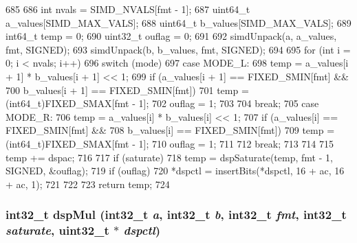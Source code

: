 \begin{DoxyCode}
685 {
686     int nvals = SIMD_NVALS[fmt - 1];
687     uint64_t a_values[SIMD_MAX_VALS];
688     uint64_t b_values[SIMD_MAX_VALS];
689     int64_t temp = 0;
690     uint32_t ouflag = 0;
691 
692     simdUnpack(a, a_values, fmt, SIGNED);
693     simdUnpack(b, b_values, fmt, SIGNED);
694 
695     for (int i = 0; i < nvals; i++) {
696         switch (mode) {
697           case MODE_L:
698             temp = a_values[i + 1] * b_values[i + 1] << 1;
699             if (a_values[i + 1] == FIXED_SMIN[fmt] &&
700                 b_values[i + 1] == FIXED_SMIN[fmt]) {
701                 temp = (int64_t)FIXED_SMAX[fmt - 1];
702                 ouflag = 1;
703             }
704             break;
705           case MODE_R:
706             temp = a_values[i] * b_values[i] << 1;
707             if (a_values[i] == FIXED_SMIN[fmt] &&
708                 b_values[i] == FIXED_SMIN[fmt]) {
709                 temp = (int64_t)FIXED_SMAX[fmt - 1];
710                 ouflag = 1;
711             }
712             break;
713         }
714 
715         temp += dspac;
716 
717         if (saturate)
718             temp = dspSaturate(temp, fmt - 1, SIGNED, &ouflag);
719         if (ouflag)
720             *dspctl = insertBits(*dspctl, 16 + ac, 16 + ac, 1);
721     }
722 
723     return temp;
724 }
\end{DoxyCode}
\hypertarget{namespaceMipsISA_a6b76ad8042f64cf6a93b1b6b8ec59d46}{
\subsubsection[{dspMul}]{\setlength{\rightskip}{0pt plus 5cm}int32\_\-t dspMul (int32\_\-t {\em a}, \/  int32\_\-t {\em b}, \/  int32\_\-t {\em fmt}, \/  int32\_\-t {\em saturate}, \/  {\bf uint32\_\-t} $\ast$ {\em dspctl})}}
\label{namespaceMipsISA_a6b76ad8042f64cf6a93b1b6b8ec59d46}



